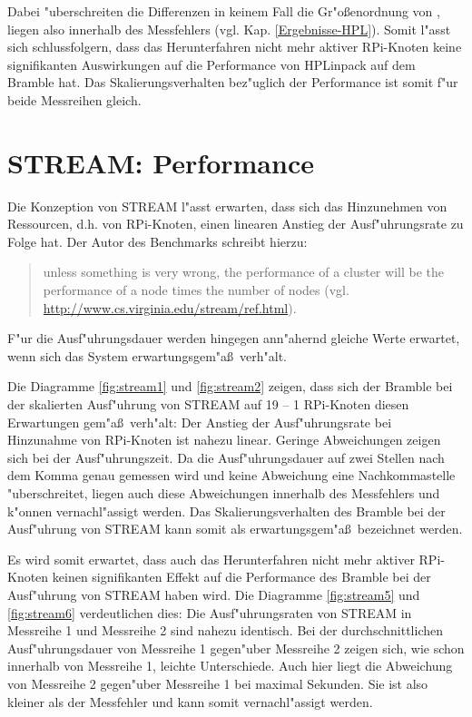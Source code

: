 Dabei "uberschreiten die Differenzen in keinem Fall die Gr"o\ss enordnung von %
, liegen also innerhalb des Messfehlers (vgl. Kap. \ref{Ergebnisse-HPL}). Somit l"asst sich schlussfolgern, dass das Herunterfahren nicht mehr aktiver RPi-Knoten keine signifikanten Auswirkungen auf die Performance von HPLinpack auf dem Bramble hat. Das Skalierungsverhalten bez"uglich der Performance ist somit f"ur beide Messreihen gleich. 

\section{STREAM: Performance}\label{Interpretation-Stream}

Die Konzeption von STREAM l"asst erwarten, dass sich das Hinzunehmen von Ressourcen, d.h. von RPi-Knoten, einen linearen Anstieg der Ausf"uhrungsrate zu Folge hat. Der Autor des Benchmarks schreibt hierzu: 
\begin{quote}
\onehalfspacing
[\dots] unless something is very wrong, the performance of a cluster will be the performance of a node times the number of nodes (vgl. \url{http://www.cs.virginia.edu/stream/ref.html}).
\end{quote}
F"ur die Ausf"uhrungsdauer werden hingegen ann"ahernd gleiche Werte erwartet, wenn sich das System erwartungsgem"a\ss\ verh"alt.

Die Diagramme \ref{fig:stream1} und \ref{fig:stream2} zeigen, dass sich der Bramble bei der skalierten Ausf"uhrung von STREAM auf 19 -- 1 RPi-Knoten diesen Erwartungen gem"a\ss\ verh"alt: Der Anstieg der  Ausf"uhrungsrate bei Hinzunahme von RPi-Knoten ist nahezu linear. Geringe Abweichungen zeigen sich bei der Ausf"uhrungszeit. Da die Ausf"uhrungsdauer auf zwei Stellen nach dem Komma genau gemessen wird und keine Abweichung eine Nachkommastelle "uberschreitet, liegen auch diese Abweichungen innerhalb des Messfehlers und k"onnen vernachl"assigt werden. Das Skalierungsverhalten des Bramble bei der Ausf"uhrung von STREAM kann somit als erwartungsgem"a\ss\ bezeichnet werden. 

Es wird somit erwartet, dass auch das Herunterfahren nicht mehr aktiver RPi-Knoten keinen signifikanten Effekt auf die Performance des Bramble bei der Ausf"uhrung von STREAM haben wird. Die Diagramme \ref{fig:stream5} und \ref{fig:stream6} verdeutlichen dies: Die Ausf"uhrungsraten von STREAM in Messreihe 1 und Messreihe 2 sind nahezu identisch. Bei der durchschnittlichen Ausf"uhrungsdauer von Messreihe 1 gegen"uber Messreihe 2 zeigen sich, wie schon innerhalb von Messreihe 1, leichte Unterschiede. Auch hier liegt die Abweichung von Messreihe 2 gegen"uber Messreihe 1 bei maximal %
Sekunden. Sie ist also kleiner als der Messfehler und kann somit vernachl"assigt werden. 


